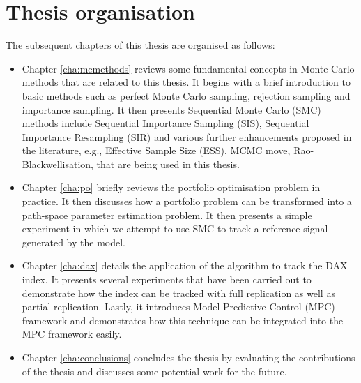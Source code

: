\section{Thesis organisation}
The subsequent chapters of this thesis are organised as follows:
\begin{itemize}
\item Chapter \ref{cha:mcmethods} reviews some fundamental concepts in Monte Carlo methods that are related to this thesis. It begins with a brief introduction to basic methods such as perfect Monte Carlo sampling, rejection sampling and importance sampling. It then presents Sequential Monte Carlo (SMC) methods include Sequential Importance Sampling (SIS), Sequential Importance Resampling (SIR) and various further enhancements proposed in the literature, e.g., Effective Sample Size (ESS), MCMC move, Rao-Blackwellisation, that are being used in this thesis.
\item Chapter \ref{cha:po} briefly reviews the portfolio optimisation problem in practice. It then discusses how a portfolio problem can be transformed into a path-space parameter estimation problem. It then presents a simple experiment in which we attempt to use SMC to track a reference signal generated by the model.
\item Chapter \ref{cha:dax} details the application of the algorithm to track the DAX index. It presents several experiments that have been carried out to demonstrate how the index can be tracked with full replication as well as partial replication. Lastly, it introduces Model Predictive Control (MPC) framework and demonstrates how this technique can be integrated into the MPC framework easily.
\item Chapter \ref{cha:conclusions} concludes the thesis by evaluating the contributions of the thesis and discusses some potential work for the future.
\end{itemize}



